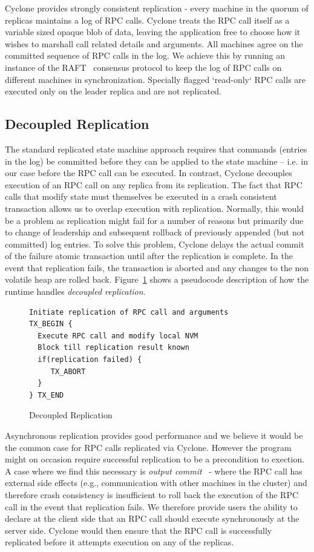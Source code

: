 \documentclass[letterpaper,twocolumn,10pt]{article}
\begin{document}
Cyclone provides strongly consistent replication - every machine in the quorum
of replicas maintains a log of RPC calls. Cyclone treats the RPC call itself as
a variable sized opaque blob of data, leaving the application free to choose how
it wishes to marshall call related details and arguments. All machines agree on
the committed sequence of RPC calls in the log. We achieve this by running an
instance of the RAFT~\cite{raft} consensus protocol to keep the log of RPC calls
on different machines in synchronization. Specially flagged `read-only` RPC
calls are executed only on the leader replica and are not replicated.

\subsection{Decoupled Replication}
\label{sec:decouple}
The standard replicated state machine approach requires that commands (entries
in the log) be committed before they can be applied to the state machine --
i.e. in our case before the RPC call can be executed. In contrast, Cyclone
decouples execution of an RPC call on any replica from its replication.
The fact that RPC calls that modify state must themselves be executed
in a crash consistent transaction allows us to overlap execution with
replication. Normally, this would be a problem as replication might fail for a
number of reasons but primarily due to change of leadership and subsequent
rollback of previously appended (but not committed) log entries. To solve this
problem, Cyclone delays the actual commit of the failure atomic transaction
until after the replication is complete. In the event that replication fails,
the transaction is aborted and any changes to the non volatile heap are rolled
back. Figure~\ref{fig:async_rep} shows a pseudocode description of how the
runtime handles \emph{decoupled replication}.

\begin{figure}
{ \scriptsize
\begin{verbatim}
Initiate replication of RPC call and arguments 
TX_BEGIN { 
  Execute RPC call and modify local NVM 
  Block till replication result known 
  if(replication failed) {
     TX_ABORT 
  } 
} TX_END
\end{verbatim}
}
\caption{Decoupled Replication}
\label{fig:async_rep}
\end{figure}

Asynchronous replication provides good performance and we believe it would be
the common case for RPC calls replicated via Cyclone. However the program might 
on occasion require successful replication to be a precondition to exection.
A case where we find this necessary is
\textit{output commit}~\cite{output_commit} - where the RPC call has
external side effects (e.g., communication with other machines in the cluster)
and therefore crash consistency is insufficient to roll back the execution of
the RPC call in the event that replication fails. We therefore provide users the
ability to declare at the client side that an RPC call should execute
synchronously at the server side. Cyclone would then ensure that the RPC
call is successfully replicated before it attempts execution on any of the
replicas.
\end{document}
